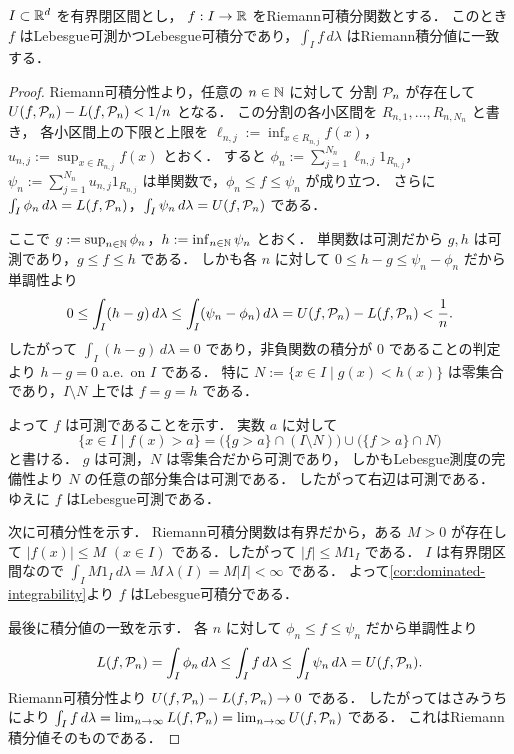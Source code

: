 \begin{theorem}[Riemann可積分ならLebesgue可積分]\label{thm:riemann-implies-lebesgue-integrable}
$I \subset \mathbb R^d$ を有界閉区間とし，
$f:I \to \mathbb R$ をRiemann可積分関数とする．
このとき $f$ はLebesgue可測かつLebesgue可積分であり，$\int_I f\,d\lambda$ はRiemann積分値に一致する．
\end{theorem}
\begin{proof}
Riemann可積分性より，任意の $n \in \mathbb N$ に対して
分割 $\mathcal P_n$ が存在して $U(f,\mathcal P_n)-L(f,\mathcal P_n)<1/n$ となる．
この分割の各小区間を $R_{n,1},\dots,R_{n,N_n}$ と書き，
各小区間上の下限と上限を
$\ell_{n,j}:=\inf_{x \in R_{n,j}} f(x)$，$u_{n,j}:=\sup_{x \in R_{n,j}} f(x)$ とおく．
すると $\phi_n:=\sum_{j=1}^{N_n} \ell_{n,j}1_{R_{n,j}}$，
$\psi_n:=\sum_{j=1}^{N_n} u_{n,j}1_{R_{n,j}}$ は単関数で，$\phi_n \le f \le \psi_n$ が成り立つ．
さらに
$\int_I \phi_n\,d\lambda = L(f,\mathcal P_n)$，$\int_I \psi_n\,d\lambda = U(f,\mathcal P_n)$ である．

ここで $g:=\sup_{n\in\mathbb N}\phi_n$，$h:=\inf_{n\in\mathbb N}\psi_n$ とおく．
単関数は可測だから $g,h$ は可測であり，$g \le f \le h$ である．
しかも各 $n$ に対して $0 \le h-g \le \psi_n-\phi_n$ だから単調性より
\[
0 \le \int_I (h-g)\,d\lambda
\le \int_I (\psi_n-\phi_n)\,d\lambda
=U(f,\mathcal P_n)-L(f,\mathcal P_n)
<\frac1n.
\]
したがって $\int_I (h-g)\,d\lambda=0$ であり，非負関数の積分が $0$ であることの判定より
$h-g=0$ a.e.\ on $I$ である．
特に $N:=\{x \in I \mid g(x)<h(x)\}$ は零集合であり，$I\setminus N$ 上では $f=g=h$ である．

よって $f$ は可測であることを示す．
実数 $a$ に対して
\[
\{x \in I \mid f(x)>a\}
=\bigl(\{g>a\}\cap(I\setminus N)\bigr)\cup\bigl(\{f>a\}\cap N\bigr)
\]
と書ける．
$g$ は可測，$N$ は零集合だから可測であり，
しかもLebesgue測度の完備性より %
$N$ の任意の部分集合は可測である．
したがって右辺は可測である．
ゆえに $f$ はLebesgue可測である．

次に可積分性を示す．
Riemann可積分関数は有界だから，ある $M>0$ が存在して
$|f(x)|\le M$ $(x \in I)$ である．したがって $|f|\le M1_I$ である．
$I$ は有界閉区間なので
$\int_I M1_I\,d\lambda = M\,\lambda(I)=M|I|<\infty$ である．
よって\cref{cor:dominated-integrability}より $f$ はLebesgue可積分である．

最後に積分値の一致を示す．
各 $n$ に対して $\phi_n \le f \le \psi_n$ だから単調性より
\[
L(f,\mathcal P_n)=\int_I \phi_n\,d\lambda
\le \int_I f\,d\lambda
\le \int_I \psi_n\,d\lambda=U(f,\mathcal P_n).
\]
Riemann可積分性より $U(f,\mathcal P_n)-L(f,\mathcal P_n)\to 0$ である．
したがってはさみうちにより
$\int_I f\,d\lambda=\lim_{n\to\infty}L(f,\mathcal P_n)=\lim_{n\to\infty}U(f,\mathcal P_n)$ である．
これはRiemann積分値そのものである．
\end{proof}

